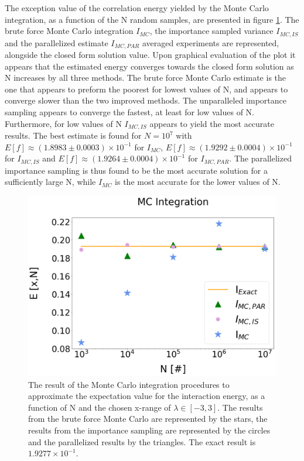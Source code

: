 \documentclass[%
reprint,nofootinbib,
amsmath,amssymb,
aps,
]{revtex4-1}
\begin{document}
The exception value of the correlation energy yielded by the Monte Carlo integration, as a function of the N random samples, are presented in figure \ref{mc}. The brute force Monte Carlo integration $I_{MC}$, the importance sampled variance $I_{MC,IS} $and the parallelized estimate $I_{MC, PAR}$ averaged experiments are represented, alongside the closed form solution value. Upon graphical evaluation of the plot it appears that the estimated energy converges towards the closed form solution as N increases by all three methods. The brute force Monte Carlo estimate is the one that appears to preform the poorest for lowest values of N, and appears to converge slower than the two improved methods. The unparalleled importance sampling appears to converge the fastest, at least for low values of N. Furthermore, for low values of N $I_{MC,IS}$ appears to yield the most accurate results. The best estimate is found for $N = 10^7$ with $E[f]\approx (1.8983 \pm 0.0003)\times 10^{-1}$ for $I_{MC}$,  $E[f]\approx (1.9292 \pm 0.0004)\times 10^{-1}$ for $I_{MC,IS}$ and $E[f]\approx (1.9264 \pm 0.0004)\times 10^{-1}$ for $I_{MC,PAR}$. The parallelized importance sampling is thus found to be the most accurate solution for a sufficiently large N, while $I_{MC}$ is the most accurate for the lower values of N. 
\begin{figure}[H]
	\includegraphics[width=\columnwidth]{MC_integration.png}
	\caption{\label{mc} The result of the Monte Carlo integration procedures to approximate the expectation value for the interaction energy, as a function of N and the chosen x-range of $\lambda \in[-3,3]$. The results from the brute force Monte Carlo are represented by the stars, the results from the importance sampling are represented by the circles and the parallelized results by the triangles. The exact result is $1.9277\times 10^{-1}$. }
\end{figure}
\end{document}
